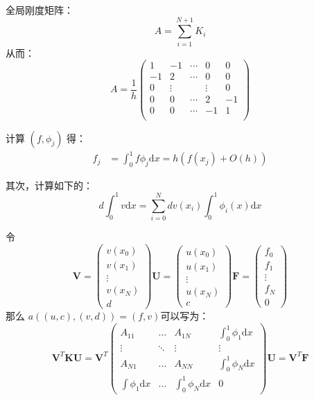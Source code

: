 \documentclass{ctexart}
\begin{document}
全局刚度矩阵：
\begin{equation}
    A = \sum_{i = 1} ^ {N+1} K_i 
\end{equation}
从而：
\begin{equation}
    A = \frac{1}{h}\begin{pmatrix}
          1 & -1 &  \cdots &0 & 0 \\
         -1 & 2  &  \cdots &0 & 0\\
          0 & \vdots &  & \vdots &0 \\
          0 & 0 & \cdots& 2 & -1\\
          0 & 0 & \cdots& -1 & 1\\
    \end{pmatrix}
\end{equation}

计算 $(f, \phi_j)$ 得：
\begin{equation}
\begin{aligned}
    f_j &= \int_0 ^ 1 f \phi_j \mathrm dx = h(f(x_j) + O(h))
\end{aligned}
\end{equation}

其次，计算如下的：
\begin{equation}
  d \int_0^1 v \mathrm dx = \sum_{i=0}^{N}dv(x_i)\int_{0}^1 \phi_i(x)\mathrm dx
\end{equation}

令 
\begin{equation}
  \mathbf{V} = \begin{pmatrix}
    v(x_0)\\
    v(x_1)\\
    \vdots\\
    v(x_N)\\
    d
  \end{pmatrix}
  \mathbf{U} = \begin{pmatrix}
    u(x_0)\\
    u(x_1)\\
    \vdots\\
    u(x_N)\\
    c
  \end{pmatrix}
  \mathbf{F} = \begin{pmatrix}
    f_0\\
    f_1\\
    \vdots\\
    f_N\\
    0
  \end{pmatrix}
\end{equation}
那么 $a((u, c), (v, d)) = (f, v)$可以写为：
\begin{equation}
  \mathbf{V}^T \mathbf{KU}=\mathbf{V}^T \begin{pmatrix}
    A_{11} & \dots & A_{1N} & \int_0^1 \phi_1 \mathrm dx\\
    \vdots & \ddots & \vdots & \vdots \\
    A_{N1}& \dots & A_{NN} & \int_0^1 \phi_N \mathrm dx\\
    \int \phi_1 \mathrm dx & \dots & \int_0^1 \phi_N \mathrm dx& 0
  \end{pmatrix}
  \mathbf{U} = \mathbf{V}^T\mathbf{F}
\end{equation}
\end{document}
